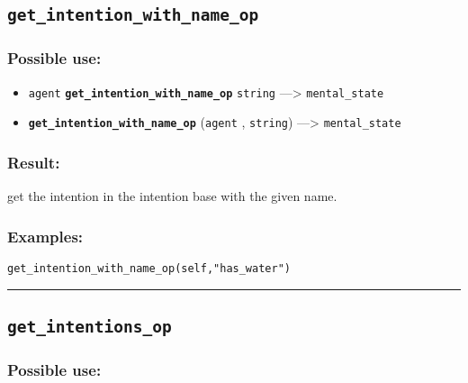 \documentclass[]{book}
\providecommand{\tightlist}{%
  \setlength{\itemsep}{0pt}\setlength{\parskip}{0pt}}
\theoremstyle{definition}
\theoremstyle{definition}
\theoremstyle{definition}
\theoremstyle{remark}
\begin{document}
\subsection{\texorpdfstring{\texttt{get\_intention\_with\_name\_op}}{get\_intention\_with\_name\_op}}\label{get_intention_with_name_op}

\subsubsection{Possible use:}\label{possible-use-215}

\begin{itemize}
\tightlist
\item
  \texttt{agent} \textbf{\texttt{get\_intention\_with\_name\_op}}
  \texttt{string} ---\textgreater{} \texttt{mental\_state}
\item
  \textbf{\texttt{get\_intention\_with\_name\_op}} (\texttt{agent} ,
  \texttt{string}) ---\textgreater{} \texttt{mental\_state}
\end{itemize}

\subsubsection{Result:}\label{result-209}

get the intention in the intention base with the given name.

\subsubsection{Examples:}\label{examples-162}

\begin{verbatim}
get_intention_with_name_op(self,"has_water") 
\end{verbatim}

\begin{center}\rule{0.5\linewidth}{\linethickness}\end{center}

\subsection{\texorpdfstring{\texttt{get\_intentions\_op}}{get\_intentions\_op}}\label{get_intentions_op}

\subsubsection{Possible use:}\label{possible-use-216}
\end{document}
